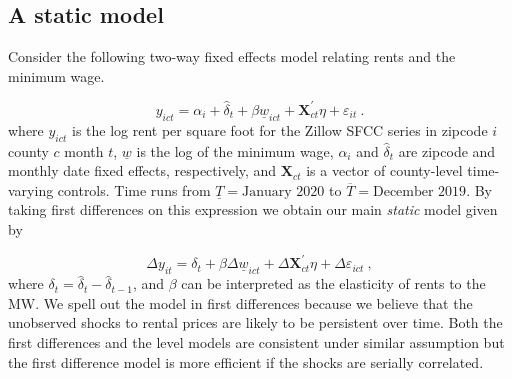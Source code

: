 \subsection{A static model}
Consider the following two-way fixed effects model relating rents and the minimum wage.

\begin{equation*} \label{eq:did_lev}
    y_{ict} = \alpha_i + \hat{\delta}_t 
    		+ \beta \underline{w}_{ict} 
    		+ \mathbf{X}^{'}_{ct}\eta 
    		+ \varepsilon_{it} \ .
\end{equation*}    
where $y_{ict}$ is the log rent per square foot for the Zillow SFCC series in zipcode 
$i$ county $c$ month $t$, $\underline{w}$ is the log of the minimum wage, $\alpha_i$ and 
$\hat{\delta}_t$ are zipcode and monthly date fixed effects, respectively, and 
$\mathbf{X}_{ct}$ is a vector of county-level time-varying controls. Time runs from 
$\underline{T} = \text{January 2020}$ to $\overline{T} = \text{December 2019}$. By taking 
first differences on this expression we obtain our main \textit{static} model given by
    
\begin{equation}\label{eq:did}
	\Delta y_{it} = \delta_t
				  + \beta \Delta \underline{w}_{ict}
				  + \Delta \mathbf{X}^{'}_{ct} \eta
				  + \Delta \varepsilon_{ict} \ ,
\end{equation}
where $\delta_t = \hat{\delta}_t - \hat{\delta}_{t-1}$, and $\beta$ can be interpreted 
as the elasticity of rents to the MW. We spell out the model in first differences because 
we believe that the unobserved shocks to rental prices are likely to be persistent over 
time. Both the first differences and the level models are consistent under similar assumption 
but the first difference model is more efficient if the shocks are serially correlated.

